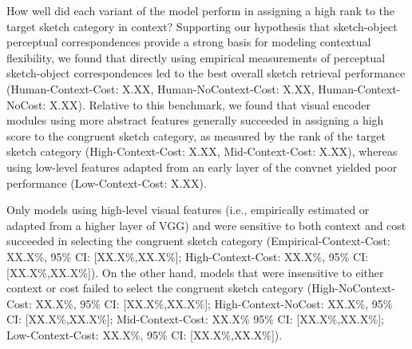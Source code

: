 \documentclass[9pt,twocolumn,twoside]{pnas-new}
\newcommand{\mwu}[1]{{\color{green}{[mwu: #1]}}}
\begin{document}
How well did each variant of the model perform in assigning a high rank to the target sketch category in context? Supporting our hypothesis that sketch-object perceptual correspondences provide a strong basis for modeling contextual flexibility, we found that directly using empirical measurements of perceptual sketch-object correspondences led to the best overall sketch retrieval performance (Human-Context-Cost: X.XX, Human-NoContext-Cost: X.XX, Human-Context-NoCost: X.XX). Relative to this benchmark, we found that visual encoder modules using more abstract features generally succeeded in assigning a high score to the congruent sketch category, as measured by the rank of the target sketch category (High-Context-Cost: X.XX, Mid-Context-Cost: X.XX), whereas using low-level features adapted from an early layer of the convnet yielded poor performance (Low-Context-Cost: X.XX). \mwu{a common metric in ML is \% of time to the correct rank is in the top N (retrieveal @ N).}

Only models using high-level visual features (i.e., empirically estimated or adapted from a higher layer of VGG) and were sensitive to both context and cost succeeded in selecting the congruent sketch category (Empirical-Context-Cost: XX.X\%, 95\% CI: [XX.X\%,XX.X\%]; High-Context-Cost: XX.X\%, 95\% CI: [XX.X\%,XX.X\%]). On the other hand, models that were insensitive to either context or cost failed to select the congruent sketch category (High-NoContext-Cost: XX.X\%, 95\% CI: [XX.X\%,XX.X\%]; High-Context-NoCost: XX.X\%, 95\% CI: [XX.X\%,XX.X\%]; Mid-Context-Cost: XX.X\% 95\% CI: [XX.X\%,XX.X\%]; Low-Context-Cost: XX.X\%, 95\% CI: [XX.X\%,XX.X\%]).
\end{document}

